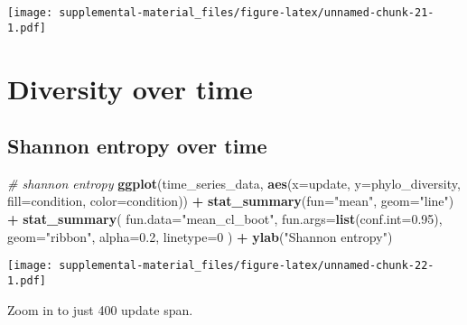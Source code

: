 \documentclass[]{book}
\newenvironment{Shaded}{\begin{snugshade}}{\end{snugshade}}
\newcommand{\CommentTok}[1]{\textcolor[rgb]{0.56,0.35,0.01}{\textit{#1}}}
\newcommand{\DataTypeTok}[1]{\textcolor[rgb]{0.13,0.29,0.53}{#1}}
\newcommand{\DecValTok}[1]{\textcolor[rgb]{0.00,0.00,0.81}{#1}}
\newcommand{\FloatTok}[1]{\textcolor[rgb]{0.00,0.00,0.81}{#1}}
\newcommand{\KeywordTok}[1]{\textcolor[rgb]{0.13,0.29,0.53}{\textbf{#1}}}
\newcommand{\NormalTok}[1]{#1}
\newcommand{\OperatorTok}[1]{\textcolor[rgb]{0.81,0.36,0.00}{\textbf{#1}}}
\newcommand{\StringTok}[1]{\textcolor[rgb]{0.31,0.60,0.02}{#1}}
\begin{document}
\texttt{[image: supplemental-material\_files/figure-latex/unnamed-chunk-21-1.pdf]}

\hypertarget{diversity-over-time}{%
\section{Diversity over time}\label{diversity-over-time}}

\hypertarget{shannon-entropy-over-time}{%
\subsection{Shannon entropy over time}\label{shannon-entropy-over-time}}

\begin{Shaded}
\begin{Highlighting}[]
\CommentTok{# shannon entropy}
\KeywordTok{ggplot}\NormalTok{(time_series_data, }\KeywordTok{aes}\NormalTok{(}\DataTypeTok{x=}\NormalTok{update, }\DataTypeTok{y=}\NormalTok{phylo_diversity, }\DataTypeTok{fill=}\NormalTok{condition, }\DataTypeTok{color=}\NormalTok{condition)) }\OperatorTok{+}
\StringTok{  }\KeywordTok{stat_summary}\NormalTok{(}\DataTypeTok{fun=}\StringTok{"mean"}\NormalTok{, }\DataTypeTok{geom=}\StringTok{"line"}\NormalTok{) }\OperatorTok{+}
\StringTok{  }\KeywordTok{stat_summary}\NormalTok{(}
    \DataTypeTok{fun.data=}\StringTok{"mean_cl_boot"}\NormalTok{,}
    \DataTypeTok{fun.args=}\KeywordTok{list}\NormalTok{(}\DataTypeTok{conf.int=}\FloatTok{0.95}\NormalTok{),}
    \DataTypeTok{geom=}\StringTok{"ribbon"}\NormalTok{,}
    \DataTypeTok{alpha=}\FloatTok{0.2}\NormalTok{,}
    \DataTypeTok{linetype=}\DecValTok{0}
\NormalTok{  ) }\OperatorTok{+}
\StringTok{  }\KeywordTok{ylab}\NormalTok{(}\StringTok{"Shannon entropy"}\NormalTok{)}
\end{Highlighting}
\end{Shaded}

\texttt{[image: supplemental-material\_files/figure-latex/unnamed-chunk-22-1.pdf]}

Zoom in to just 400 update span.
\end{document}
